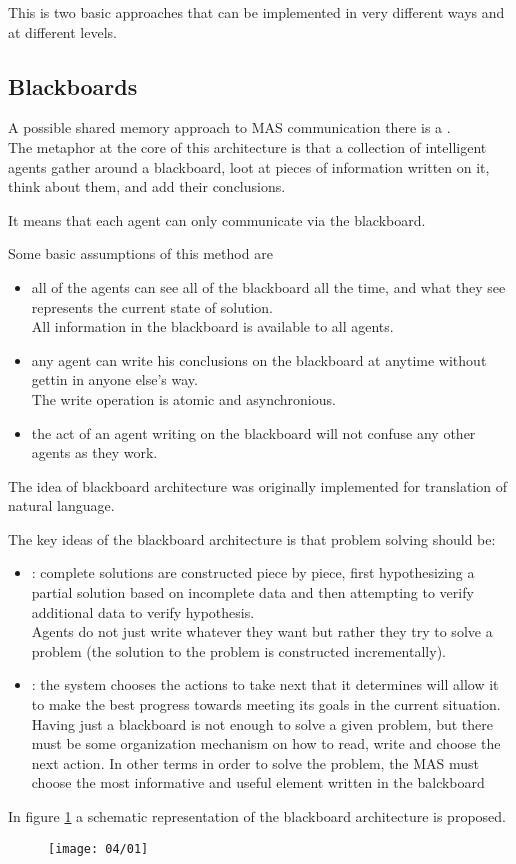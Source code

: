 This is two basic approaches that can be implemented in very different ways and at different levels.
\subsection{Blackboards}
A possible shared memory approach to MAS communication there is a .\\
The metaphor at the core of this architecture is that a collection of intelligent agents gather around a blackboard, loot at pieces of information written on it, think about them, and add their conclusions.

It means that each agent can only communicate via the blackboard.

Some basic assumptions of this method are 
\begin{itemize}
\item all of the agents can see all of the blackboard all the time, and what they see represents the current state of solution.\\
All information in the blackboard is available to all agents.
\item any agent can write his conclusions on the blackboard at anytime without gettin in anyone else's way.\\
The write operation is atomic and asynchronious.
\item the act of an agent writing on the blackboard will not confuse any other agents as they work.
\end{itemize}
The idea of blackboard architecture was originally implemented for translation of natural language.

The key ideas of the blackboard architecture is that problem solving should be:
\begin{itemize}
\item {}: complete solutions are constructed piece by piece, first hypothesizing a partial solution based on incomplete data and then attempting to verify additional data to verify hypothesis.\\

Agents do not just write whatever they want but rather they try to solve a problem (the solution to the problem is constructed incrementally).
\item {}: the system chooses the actions to take next that it determines will allow it to make the best progress towards meeting its goals in the current situation.\\

Having just a blackboard is not enough to solve a given problem, but there must be some organization mechanism on how to read, write and choose the next action. In other terms in order to solve the problem, the MAS must choose the most informative and useful element written in the balckboard
\end{itemize}
In figure \ref{fig:0401} a schematic representation of the blackboard architecture is proposed.
\begin{figure}[!h]
\centering
\texttt{[image: 04/01]}
\caption{}
\label{fig:0401}
\end{figure}

